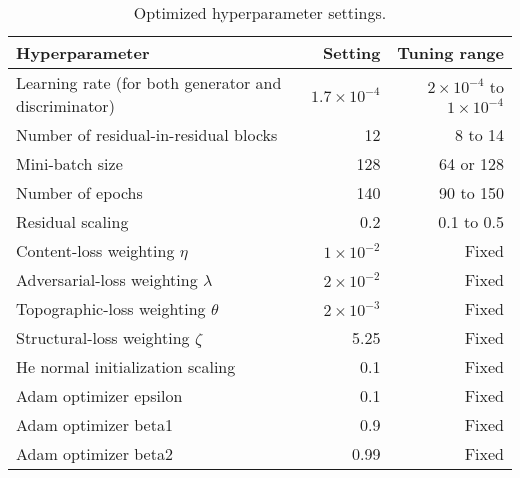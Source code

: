 \begin{table}[b!]
  \small
  \caption{Optimized hyperparameter settings.}
  \label{table:B1}
  \begin{tabularx}{\textwidth}{lrr}
  \hline
  Hyperparameter                                       & Setting             & Tuning range                           \\
  \hline
  Learning rate (for both generator and discriminator) & $1.7\times 10^{-4}$ & $2\times 10^{-4}$ to $1\times 10^{-4}$ \\
  Number of residual-in-residual blocks                & 12                  & 8 to 14                                \\
  Mini-batch size                                      & 128                 & 64 or 128                              \\
  Number of epochs                                     & 140                 & 90 to 150                              \\
  Residual scaling                                     & 0.2                 & 0.1 to 0.5                             \\
  Content-loss weighting $\eta$                        & $1\times 10^{-2}$   & Fixed                                  \\
  Adversarial-loss weighting $\lambda$                 & $2\times 10^{-2}$   & Fixed                                  \\
  Topographic-loss weighting $\theta$                  & $2\times 10^{-3}$   & Fixed                                  \\
  Structural-loss weighting $\zeta$                    & 5.25                & Fixed                                  \\
  He normal initialization scaling                     & 0.1                 & Fixed                                  \\
  Adam optimizer epsilon                               & 0.1                 & Fixed                                  \\
  Adam optimizer beta1                                 & 0.9                 & Fixed                                  \\
  Adam optimizer beta2                                 & 0.99                & Fixed                                  \\
  \hline
  \end{tabularx}
\end{table}

